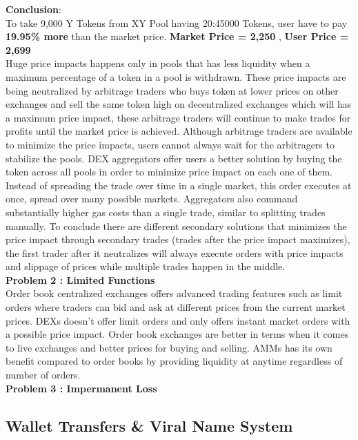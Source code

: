 \documentclass[10pt]{article}
\begin{document}
\textbf{Conclusion}:\\
To take 9,000 Y Tokens from XY Pool having 20:45000 Tokens, user have to pay \textbf{19.95\% more} than the market price. \textbf{Market Price = 2,250} , \textbf{User Price = 2,699}\\


Huge price impacts happens only in pools that has less liquidity when a maximum percentage of a token in a pool is withdrawn. These price impacts are being neutralized by arbitrage traders who buys token at lower prices on other exchanges and sell the same token high on decentralized exchanges which will has a maximum price impact, these arbitrage traders will continue to make trades for profits until the market price is achieved. Although arbitrage traders are available to minimize the price impacts, users cannot always wait for the arbitragers to stabilize the pools. DEX aggregators offer users a better solution by buying the token across all pools in order to minimize price impact on each one of them. Instead of spreading the trade over time in a single market, this order executes at once, spread over many possible markets. Aggregators also command substantially higher gas costs than a single trade, similar to splitting trades manually. To conclude there are different secondary solutions that minimizes the price impact through secondary trades (trades after the price impact maximizes), the first trader after it neutralizes will always execute orders with price impacts and slippage of prices while multiple trades happen in the middle.\\

\textbf{Problem 2 : Limited Functions}\\

Order book centralized exchanges offers advanced trading features such as limit orders where traders can bid and ask at different prices from the current market prices. DEXs doesn't offer limit orders and only offers instant market orders with a possible price impact. Order book exchanges are better in terms when it comes to live exchanges and better prices for buying and selling. AMMs has its own benefit compared to order books by providing liquidity at anytime regardless of number of orders.\\

\textbf{Problem 3 : Impermanent Loss}\\




\subsection{Wallet Transfers \& Viral Name System}
\end{document}
